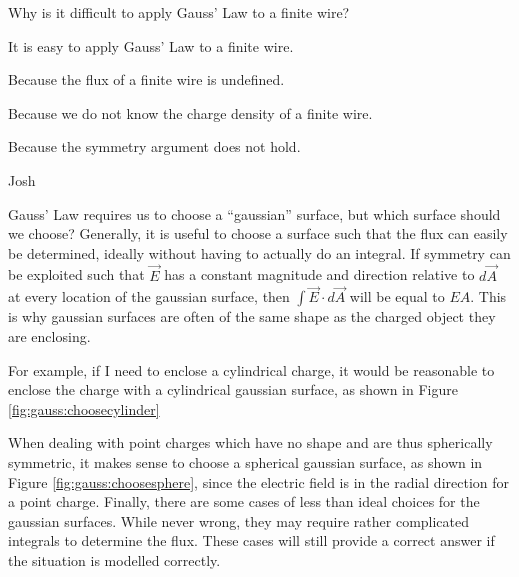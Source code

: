 \begin{checkpoint}\label{cp:gauss:gausswire}
	\begin{MCquestion}{Why is it difficult to apply Gauss' Law to a finite wire?}
		\item It is easy to apply Gauss' Law to a finite wire.
		\item Because the flux of a finite wire is undefined.
		\item Because we do not know the charge density of a finite wire.
		\item Because the symmetry argument does not hold. \correct
	\end{MCquestion}
\end{checkpoint}
\vspace{-0.25cm}
\begin{studentOpinion}{Josh}
	
Gauss' Law requires us to choose a ``gaussian'' surface, but which surface should we choose? Generally, it is useful to choose a surface such that the flux can easily be determined, ideally without having to actually do an integral. If symmetry can be exploited such that $\vec E$ has a constant magnitude and direction relative to $d\vec A$ at every location of the gaussian surface, then $\int \vec E \cdot d\vec A$ will be equal to $E A$. This is why gaussian surfaces are often of the same shape as the charged object they are enclosing.
	
For example, if I need to enclose a cylindrical charge, it would be reasonable to enclose the charge with a cylindrical gaussian surface, as shown in Figure \ref{fig:gauss:choosecylinder}
	
When dealing with point charges which have no shape and are thus spherically symmetric, it makes sense to choose a spherical gaussian surface, as shown in Figure \ref{fig:gauss:choosesphere}, since the electric field is in the radial direction for a point charge.
Finally, there are some cases of less than ideal choices for the gaussian surfaces. While never wrong, they may require rather complicated integrals to determine the flux. These cases will still provide a correct answer if the situation is modelled correctly.


\end{studentOpinion}
